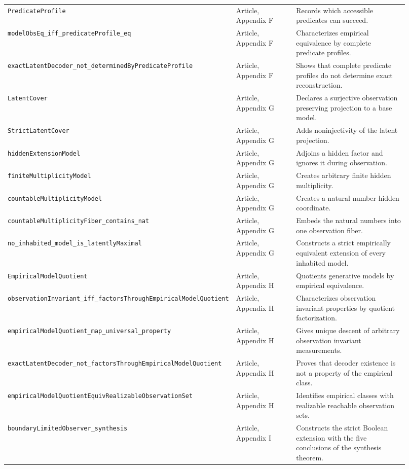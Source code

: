 \begin{landscape}
\begin{longtable}{@{}>{\raggedright\arraybackslash}p{0.31\linewidth}>{\raggedright\arraybackslash}p{0.20\linewidth}>{\raggedright\arraybackslash}p{0.41\linewidth}@{}}
\nolinkurl{PredicateProfile} & Article, Appendix F & Records which accessible predicates can succeed. \\
\nolinkurl{modelObsEq_iff_predicateProfile_eq} & Article, Appendix F & Characterizes empirical equivalence by complete predicate profiles. \\
\nolinkurl{exactLatentDecoder_not_determinedByPredicateProfile} & Article, Appendix F & Shows that complete predicate profiles do not determine exact reconstruction. \\
\nolinkurl{LatentCover} & Article, Appendix G & Declares a surjective observation preserving projection to a base model. \\
\nolinkurl{StrictLatentCover} & Article, Appendix G & Adds noninjectivity of the latent projection. \\
\nolinkurl{hiddenExtensionModel} & Article, Appendix G & Adjoins a hidden factor and ignores it during observation. \\
\nolinkurl{finiteMultiplicityModel} & Article, Appendix G & Creates arbitrary finite hidden multiplicity. \\
\nolinkurl{countableMultiplicityModel} & Article, Appendix G & Creates a natural number hidden coordinate. \\
\nolinkurl{countableMultiplicityFiber_contains_nat} & Article, Appendix G & Embeds the natural numbers into one observation fiber. \\
\nolinkurl{no_inhabited_model_is_latentlyMaximal} & Article, Appendix G & Constructs a strict empirically equivalent extension of every inhabited model. \\
\nolinkurl{EmpiricalModelQuotient} & Article, Appendix H & Quotients generative models by empirical equivalence. \\
\nolinkurl{observationInvariant_iff_factorsThroughEmpiricalModelQuotient} & Article, Appendix H & Characterizes observation invariant properties by quotient factorization. \\
\nolinkurl{empiricalModelQuotient_map_universal_property} & Article, Appendix H & Gives unique descent of arbitrary observation invariant measurements. \\
\nolinkurl{exactLatentDecoder_not_factorsThroughEmpiricalModelQuotient} & Article, Appendix H & Proves that decoder existence is not a property of the empirical class. \\
\nolinkurl{empiricalModelQuotientEquivRealizableObservationSet} & Article, Appendix H & Identifies empirical classes with realizable reachable observation sets. \\
\nolinkurl{boundaryLimitedObserver_synthesis} & Article, Appendix I & Constructs the strict Boolean extension with the five conclusions of the synthesis theorem. \\
\end{longtable}
\end{landscape}
